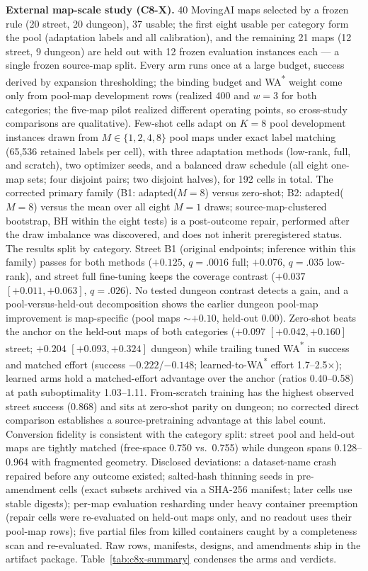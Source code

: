 \documentclass[letterpaper]{article} %
\begin{document}
\textbf{External map-scale study (C8-X).} 40 MovingAI maps selected by a
frozen rule (20 street, 20 dungeon), 37 usable; the first eight usable
per category form the pool (adaptation labels and all calibration), and
the remaining 21 maps (12 street, 9 dungeon) are held out with 12 frozen
evaluation instances each --- a single frozen source-map split. Every arm runs once at a large budget, success derived by expansion thresholding; the binding budget and WA\textsuperscript{*} weight come
only from pool-map development rows (realized 400 and $w{=}3$ for both categories; the five-map pilot realized different operating points, so cross-study comparisons are qualitative). Few-shot
cells adapt on $K{=}8$ pool development instances drawn from $M \in \{1,
2, 4, 8\}$ pool maps under exact label matching (65{,}536 retained labels per cell), with three adaptation methods (low-rank, full, and scratch), two optimizer seeds, and a balanced draw schedule (all eight one-map sets; four disjoint pairs; two disjoint halves), for 192 cells in total. The corrected primary family (B1:
adapted($M{=}8$) versus zero-shot; B2: adapted($M{=}8$) versus the mean
over all eight $M{=}1$ draws; source-map-clustered bootstrap, BH within the eight tests) is a post-outcome repair, performed after the draw imbalance was discovered, and does not inherit preregistered status. The results split by category. Street B1 (original endpoints; inference within this family) passes for both
methods ($+0.125$, $q{=}.0016$ full; $+0.076$, $q{=}.035$ low-rank), and street full fine-tuning keeps the coverage contrast ($+0.037$ $[+0.011,+0.063]$, $q{=}.026$). No tested dungeon contrast detects a gain, and a pool-versus-held-out decomposition shows the earlier dungeon pool-map improvement is map-specific (pool maps ${\sim}+0.10$, held-out $0.00$). Zero-shot beats the anchor on the held-out maps of both
categories ($+0.097$ $[+0.042,+0.160]$ street; $+0.204$ $[+0.093,+0.324]$
dungeon) while trailing tuned WA\textsuperscript{*} in success and matched effort (success $-0.222$/$-0.148$; learned-to-WA\textsuperscript{*}
effort 1.7--2.5$\times$); learned arms hold a matched-effort advantage
over the anchor (ratios 0.40--0.58) at path suboptimality 1.03--1.11.
From-scratch training has the highest observed street success (0.868)
and sits at zero-shot parity on dungeon; no corrected direct comparison
establishes a source-pretraining advantage at this label count. Conversion fidelity is consistent with the category split: street pool and held-out maps are tightly matched (free-space 0.750 vs.\ 0.755) while dungeon spans 0.128--0.964 with fragmented
geometry. Disclosed deviations: a dataset-name crash repaired before any
outcome existed; salted-hash thinning seeds in pre-amendment cells
(exact subsets archived via a SHA-256 manifest; later cells use stable
digests); per-map evaluation resharding under heavy container preemption
(repair cells were re-evaluated on held-out maps only, and no readout uses their pool-map rows); five partial files from killed containers caught by a completeness scan and re-evaluated. Raw rows, manifests, designs, and
amendments ship in the artifact package. Table~\ref{tab:c8x-summary} condenses the arms and verdicts.
\end{document}
